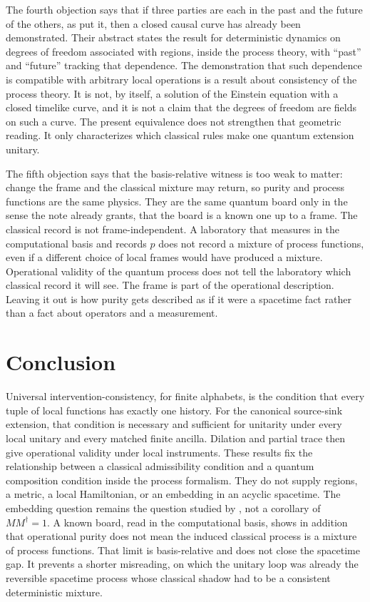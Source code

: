 \documentclass[11pt]{article}
\begin{document}
The fourth objection says that if three parties are each in the past and the future of the others, as \citet{baumeler2019} put it, then a closed causal curve has already been demonstrated. Their abstract states the result for deterministic dynamics on degrees of freedom associated with regions, inside the process theory, with ``past'' and ``future'' tracking that dependence. The demonstration that such dependence is compatible with arbitrary local operations is a result about consistency of the process theory. It is not, by itself, a solution of the Einstein equation with a closed timelike curve, and it is not a claim that the degrees of freedom are fields on such a curve. The present equivalence does not strengthen that geometric reading. It only characterizes which classical rules make one quantum extension unitary.

The fifth objection says that the basis-relative witness is too weak to matter: change the frame and the classical mixture may return, so purity and process functions are the same physics. They are the same quantum board only in the sense the note already grants, that the board is a known one up to a frame. The classical record is not frame-independent. A laboratory that measures in the computational basis and records \(p\) does not record a mixture of process functions, even if a different choice of local frames would have produced a mixture. Operational validity of the quantum process does not tell the laboratory which classical record it will see. The frame is part of the operational description. Leaving it out is how purity gets described as if it were a spacetime fact rather than a fact about operators and a measurement.

\section{Conclusion}
\label{sec:end}

Universal intervention-consistency, for finite alphabets, is the condition that every tuple of local functions has exactly one history. For the canonical source-sink extension, that condition is necessary and sufficient for unitarity under every local unitary and every matched finite ancilla. Dilation and partial trace then give operational validity under local instruments. These results fix the relationship between a classical admissibility condition and a quantum composition condition inside the process formalism. They do not supply regions, a metric, a local Hamiltonian, or an embedding in an acyclic spacetime. The embedding question remains the question studied by \citet{vilasini2024}, not a corollary of \(MM^{\dagger}=1\). A known board, read in the computational basis, shows in addition that operational purity does not mean the induced classical process is a mixture of process functions. That limit is basis-relative and does not close the spacetime gap. It prevents a shorter misreading, on which the unitary loop was already the reversible spacetime process whose classical shadow had to be a consistent deterministic mixture.
\end{document}
